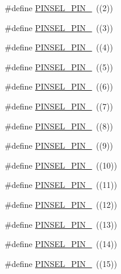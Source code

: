\begin{DoxyCompactItemize}
\item 
\#define \hyperlink{group___p_i_n_s_e_l___public___macros_ga9d1834ec06bf0543870697aff2019b9f}{\-P\-I\-N\-S\-E\-L\-\_\-\-P\-I\-N\-\_}~((2))
\item 
\#define \hyperlink{group___p_i_n_s_e_l___public___macros_ga181d387f7b6aa5f8d11d11571e770792}{\-P\-I\-N\-S\-E\-L\-\_\-\-P\-I\-N\-\_}~((3))
\item 
\#define \hyperlink{group___p_i_n_s_e_l___public___macros_ga160a6ed203a310444304dd0c284bb698}{\-P\-I\-N\-S\-E\-L\-\_\-\-P\-I\-N\-\_}~((4))
\item 
\#define \hyperlink{group___p_i_n_s_e_l___public___macros_ga5979b18582a24b9cb7d34683177f2e2c}{\-P\-I\-N\-S\-E\-L\-\_\-\-P\-I\-N\-\_}~((5))
\item 
\#define \hyperlink{group___p_i_n_s_e_l___public___macros_gab60e9a23a646c4f8525b7731a14e98b9}{\-P\-I\-N\-S\-E\-L\-\_\-\-P\-I\-N\-\_}~((6))
\item 
\#define \hyperlink{group___p_i_n_s_e_l___public___macros_gafeb1600b848f4638595c4e9df38189cc}{\-P\-I\-N\-S\-E\-L\-\_\-\-P\-I\-N\-\_}~((7))
\item 
\#define \hyperlink{group___p_i_n_s_e_l___public___macros_gac8ba0c15c6f09a073231c8819f5d5815}{\-P\-I\-N\-S\-E\-L\-\_\-\-P\-I\-N\-\_}~((8))
\item 
\#define \hyperlink{group___p_i_n_s_e_l___public___macros_ga7c6bcb2cc66e084d83758723ba42a9b8}{\-P\-I\-N\-S\-E\-L\-\_\-\-P\-I\-N\-\_}~((9))
\item 
\#define \hyperlink{group___p_i_n_s_e_l___public___macros_ga26ae3a32a8ac30b72df02438baadfdce}{\-P\-I\-N\-S\-E\-L\-\_\-\-P\-I\-N\-\_}~((10))
\item 
\#define \hyperlink{group___p_i_n_s_e_l___public___macros_gaf04d143c6e91c484c6d113922e8f2936}{\-P\-I\-N\-S\-E\-L\-\_\-\-P\-I\-N\-\_}~((11))
\item 
\#define \hyperlink{group___p_i_n_s_e_l___public___macros_ga9ef4030bbae13e89349b3c3ee5e7cbe3}{\-P\-I\-N\-S\-E\-L\-\_\-\-P\-I\-N\-\_}~((12))
\item 
\#define \hyperlink{group___p_i_n_s_e_l___public___macros_gad10a5248395d859c7c831dd35a3ef81a}{\-P\-I\-N\-S\-E\-L\-\_\-\-P\-I\-N\-\_}~((13))
\item 
\#define \hyperlink{group___p_i_n_s_e_l___public___macros_ga953c421f0a1e597783224c8fbd2402ef}{\-P\-I\-N\-S\-E\-L\-\_\-\-P\-I\-N\-\_}~((14))
\item 
\#define \hyperlink{group___p_i_n_s_e_l___public___macros_ga0687cf1015a3d95844c2df3584797d75}{\-P\-I\-N\-S\-E\-L\-\_\-\-P\-I\-N\-\_}~((15))

\end{DoxyCompactItemize}
